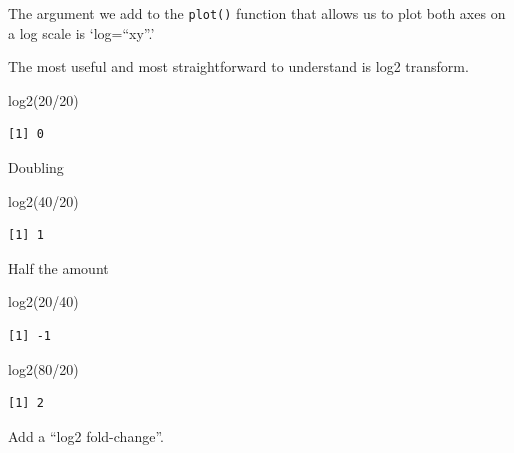 \documentclass[
  letterpaper,
  DIV=11,
  numbers=noendperiod]{scrartcl}
\newenvironment{Shaded}{\begin{snugshade}}{\end{snugshade}}
\newcommand{\DecValTok}[1]{\textcolor[rgb]{0.68,0.00,0.00}{#1}}
\newcommand{\FunctionTok}[1]{\textcolor[rgb]{0.28,0.35,0.67}{#1}}
\newcommand{\NormalTok}[1]{\textcolor[rgb]{0.00,0.23,0.31}{#1}}
\newcommand{\OtherTok}[1]{\textcolor[rgb]{0.00,0.23,0.31}{#1}}
\newcommand{\SpecialCharTok}[1]{\textcolor[rgb]{0.37,0.37,0.37}{#1}}
\begin{document}
The argument we add to the \texttt{plot()} function that allows us to
plot both axes on a log scale is `log=``xy''.'

The most useful and most straightforward to understand is log2
transform.

\begin{Shaded}
\begin{Highlighting}[]
\FunctionTok{log2}\NormalTok{(}\DecValTok{20}\SpecialCharTok{/}\DecValTok{20}\NormalTok{)}
\end{Highlighting}
\end{Shaded}

\begin{verbatim}
[1] 0
\end{verbatim}

Doubling

\begin{Shaded}
\begin{Highlighting}[]
\FunctionTok{log2}\NormalTok{(}\DecValTok{40}\SpecialCharTok{/}\DecValTok{20}\NormalTok{)}
\end{Highlighting}
\end{Shaded}

\begin{verbatim}
[1] 1
\end{verbatim}

Half the amount

\begin{Shaded}
\begin{Highlighting}[]
\FunctionTok{log2}\NormalTok{(}\DecValTok{20}\SpecialCharTok{/}\DecValTok{40}\NormalTok{)}
\end{Highlighting}
\end{Shaded}

\begin{verbatim}
[1] -1
\end{verbatim}

\begin{Shaded}
\begin{Highlighting}[]
\FunctionTok{log2}\NormalTok{(}\DecValTok{80}\SpecialCharTok{/}\DecValTok{20}\NormalTok{)}
\end{Highlighting}
\end{Shaded}

\begin{verbatim}
[1] 2
\end{verbatim}

Add a ``log2 fold-change''.

\begin{Shaded}
\end{Shaded}
\end{document}
